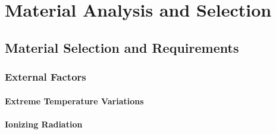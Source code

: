 \section{Material Analysis and Selection}







\subsection{Material Selection and Requirements}

\subsubsection{External Factors}

\paragraph{Extreme Temperature Variations}

\paragraph{Ionizing Radiation}


